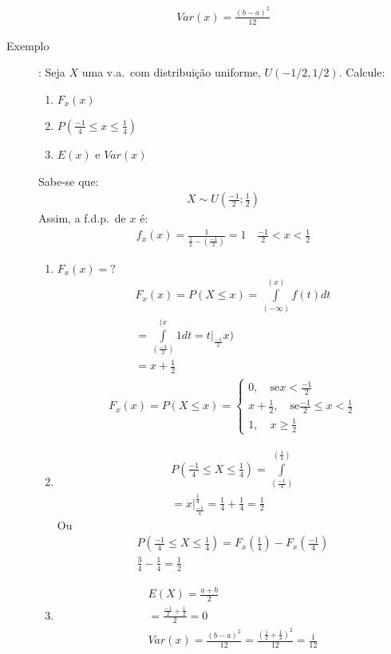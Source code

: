 \begin{description}
\begin{align*}
     Var(x) = \frac{ \left(b-a\right)^2 }{12}
   \end{align*}
   \item[Exemplo]: Seja $X$ uma v.a.\ com distribuição uniforme, $U(-1/2 , 1/2). $
     Calcule:
\begin{enumerate}[label=(\alph*)]
  \item $F_{x} (x)$
  \item $P(\frac{-1}{4} \leq x \leq \frac{1}{4})$
  \item $E(x)$ e $Var(x)$
\end{enumerate}
Sabe-se que:
\begin{align*}
  X \mathtt{\sim}  U(\frac{-1}{2}; \frac{1}{2})
\end{align*}
Assim, a f.d.p.\ de $x$ é:
\begin{align*}
  f_{x} (x)= \frac{1}{\frac{1}{2}- \left( \frac{-1}{2}\right)} = 1 \quad \frac{-1}{2}<x<\frac{1}{2}
\end{align*}
\begin{enumerate}[label=(\alph*)]
  \item  $F_{x}(x)=?$
    \begin{align*}
      F_{x} (x)= P(X \leq x) = \int \limits_{( -\infty  )}^{(x)} f(t)dt\\
      = \int \limits_{(\frac{-1}{2})}^{(x} 1 dt= t|_{\frac{-1}{2}}{x)} \\
      = x+ \frac{1}{2}
    \end{align*}
    \begin{align*}
      F_{x} (x) = P(X \leq x) = \begin{cases}
        0, \quad \text{se}  x< \frac{-1}{2} \\
        x+ \frac{1}{2} , \quad \text{se} \frac{-1}{2} \leq x < \frac{1}{2} \\
        1, \quad x \ge \frac{1}{2}
      \end{cases}
    \end{align*}
    \item 
      \begin{align*}
      P(\frac{-1}{4}\leq X \leq \frac{1}{4})  = \int \limits_{(\frac{-1}{4})}^{(\frac{1}{4})}\\
      = x|_{\frac{-1}{4}}^{\frac{1}{4}}= \frac{1}{4}+\frac{1}{4}=\frac{1}{2}
    \end{align*}
    Ou 
    \begin{align*}
      P(\frac{-1}{4} \leq X \leq \frac{1}{4})= F_{x}(\frac{1}{4})-F_{x}(\frac{-1}{4}) \\
      \frac{3}{4}- \frac{1}{4}= \frac{1}{2}
    \end{align*}
    \item 
      \begin{align*}
        E(X) = \frac{a+b}{2} \\
        = \frac{\frac{-1}{2} + \frac{1}{2}}{2}=0\\
        Var(x)= \frac{ \left( b-a \right)^2 }{12}= \frac{ \left( \frac{1}{2} + \frac{1}{2} \right)^2 }{12}= \frac{1}{12}
      \end{align*}
\end{enumerate}

   \end{description}
